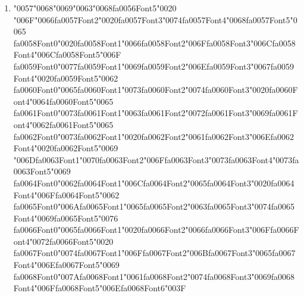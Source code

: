 \documentclass[11pt]{article}
\begin{document}
\begin{enumerate}[leftmargin=*]
  \item {\char"0057}{\char"0068}{\char"0069}{\char"0063}{\char"0068}{\csname fa0056Font5\endcsname\char"0020} {\char"006F}{\char"0066}{\csname fa0057Font2\endcsname\char"0020}{\csname fa0057Font3\endcsname\char"0074}{\csname fa0057Font4\endcsname\char"0068}{\csname fa0057Font5\endcsname\char"0065} {\csname fa0058Font0\endcsname\char"0020}{\csname fa0058Font1\endcsname\char"0066}{\csname fa0058Font2\endcsname\char"006F}{\csname fa0058Font3\endcsname\char"006C}{\csname fa0058Font4\endcsname\char"006C}{\csname fa0058Font5\endcsname\char"006F} {\csname fa0059Font0\endcsname\char"0077}{\csname fa0059Font1\endcsname\char"0069}{\csname fa0059Font2\endcsname\char"006E}{\csname fa0059Font3\endcsname\char"0067}{\csname fa0059Font4\endcsname\char"0020}{\csname fa0059Font5\endcsname\char"0062} {\csname fa0060Font0\endcsname\char"0065}{\csname fa0060Font1\endcsname\char"0073}{\csname fa0060Font2\endcsname\char"0074}{\csname fa0060Font3\endcsname\char"0020}{\csname fa0060Font4\endcsname\char"0064}{\csname fa0060Font5\endcsname\char"0065} {\csname fa0061Font0\endcsname\char"0073}{\csname fa0061Font1\endcsname\char"0063}{\csname fa0061Font2\endcsname\char"0072}{\csname fa0061Font3\endcsname\char"0069}{\csname fa0061Font4\endcsname\char"0062}{\csname fa0061Font5\endcsname\char"0065} {\csname fa0062Font0\endcsname\char"0073}{\csname fa0062Font1\endcsname\char"0020}{\csname fa0062Font2\endcsname\char"0061}{\csname fa0062Font3\endcsname\char"006E}{\csname fa0062Font4\endcsname\char"0020}{\csname fa0062Font5\endcsname\char"0069} {\char"006D}{\csname fa0063Font1\endcsname\char"0070}{\csname fa0063Font2\endcsname\char"006F}{\csname fa0063Font3\endcsname\char"0073}{\csname fa0063Font4\endcsname\char"0073}{\csname fa0063Font5\endcsname\char"0069} {\csname fa0064Font0\endcsname\char"0062}{\csname fa0064Font1\endcsname\char"006C}{\csname fa0064Font2\endcsname\char"0065}{\csname fa0064Font3\endcsname\char"0020}{\csname fa0064Font4\endcsname\char"006F}{\csname fa0064Font5\endcsname\char"0062} {\csname fa0065Font0\endcsname\char"006A}{\csname fa0065Font1\endcsname\char"0065}{\csname fa0065Font2\endcsname\char"0063}{\csname fa0065Font3\endcsname\char"0074}{\csname fa0065Font4\endcsname\char"0069}{\csname fa0065Font5\endcsname\char"0076} {\csname fa0066Font0\endcsname\char"0065}{\csname fa0066Font1\endcsname\char"0020}{\csname fa0066Font2\endcsname\char"0066}{\csname fa0066Font3\endcsname\char"006F}{\csname fa0066Font4\endcsname\char"0072}{\csname fa0066Font5\endcsname\char"0020} {\csname fa0067Font0\endcsname\char"0074}{\csname fa0067Font1\endcsname\char"006F}{\csname fa0067Font2\endcsname\char"006B}{\csname fa0067Font3\endcsname\char"0065}{\csname fa0067Font4\endcsname\char"006E}{\csname fa0067Font5\endcsname\char"0069} {\csname fa0068Font0\endcsname\char"007A}{\csname fa0068Font1\endcsname\char"0061}{\csname fa0068Font2\endcsname\char"0074}{\csname fa0068Font3\endcsname\char"0069}{\csname fa0068Font4\endcsname\char"006F}{\csname fa0068Font5\endcsname\char"006E}{\csname fa0068Font6\endcsname\char"003F}

\end{enumerate}
\end{document}
